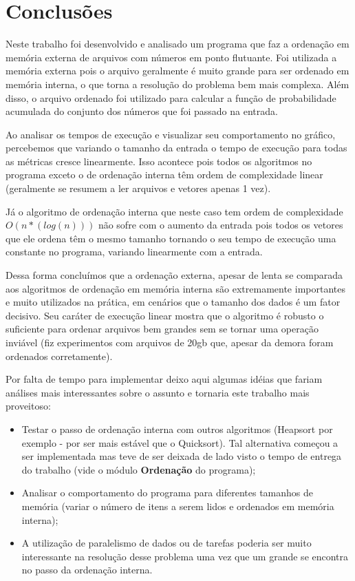 \documentclass[12pt]{article}
\begin{document}
\section{Conclusões}
\label{conclusao}

Neste trabalho foi desenvolvido e analisado um programa que faz a ordenação em memória 
externa de arquivos com números em ponto flutuante. Foi utilizada a memória externa pois o arquivo
geralmente é muito grande para ser ordenado em memória interna, o que torna a resolução do problema
bem mais complexa. Além disso, o arquivo ordenado foi utilizado para calcular a função de probabilidade acumulada do conjunto dos números que foi passado na entrada.

Ao analisar os tempos de execução e visualizar seu comportamento no gráfico, percebemos que variando
o tamanho da entrada o tempo de execução para todas as métricas cresce linearmente. Isso acontece pois
 todos os algoritmos no programa exceto o de ordenação interna têm ordem de complexidade linear (geralmente se resumem a ler arquivos e vetores apenas 1 vez). 
 
Já o algoritmo de ordenação interna que neste caso tem ordem de complexidade $O(n*(log(n)))$ não sofre
 com o aumento da entrada pois todos os vetores que ele ordena têm o mesmo tamanho tornando o seu tempo de execução uma constante no programa, variando linearmente com a entrada.
 
Dessa forma concluímos que a ordenação externa, apesar de lenta se comparada aos algoritmos de ordenação 
em memória interna são extremamente importantes e muito utilizados na prática, em cenários que o tamanho
 dos dados é um fator decisivo. Seu caráter de execução linear mostra que o algoritmo é robusto o
 suficiente para ordenar arquivos bem grandes sem se tornar uma operação inviável (fiz experimentos com arquivos de 20gb que, apesar da demora foram ordenados corretamente).

Por falta de tempo para implementar deixo aqui algumas idéias que fariam análises mais interessantes sobre o assunto e tornaria este trabalho mais proveitoso:
\begin{itemize}
\item Testar o passo de ordenação interna com outros algoritmos (Heapsort por exemplo - por
ser mais estável que o Quicksort). Tal alternativa começou a ser implementada mas teve de ser deixada de lado visto o tempo de entrega do trabalho (vide o módulo \textbf{Ordenação} do programa);
\item Analisar o comportamento do programa para diferentes tamanhos de memória (variar o 
número de itens a serem lidos e ordenados em memória interna);
\item A utilização de paralelismo de dados ou de tarefas poderia ser muito interessante na resolução desse problema uma vez que um grande se encontra no passo da ordenação interna.
\end{itemize}
\end{document}
